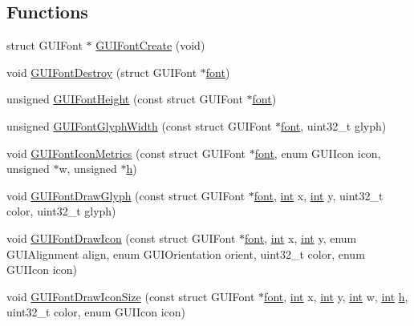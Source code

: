 \subsection*{Functions}
\begin{DoxyCompactItemize}
\item 
struct G\+U\+I\+Font $\ast$ \mbox{\hyperlink{wii_2gui-font_8c_afeda865aa70118eb5e13639aeea185e5}{G\+U\+I\+Font\+Create}} (void)
\item 
void \mbox{\hyperlink{wii_2gui-font_8c_aa30d3bddfd055be2a203306973eb2b6a}{G\+U\+I\+Font\+Destroy}} (struct G\+U\+I\+Font $\ast$\mbox{\hyperlink{wii_2main_8c_adae3f41cbe0ea5e886715661bb739691}{font}})
\item 
unsigned \mbox{\hyperlink{wii_2gui-font_8c_a6d539c7b23450b8918bb6499e2c11042}{G\+U\+I\+Font\+Height}} (const struct G\+U\+I\+Font $\ast$\mbox{\hyperlink{wii_2main_8c_adae3f41cbe0ea5e886715661bb739691}{font}})
\item 
unsigned \mbox{\hyperlink{wii_2gui-font_8c_a4b38c72440f93dd3f4c6d01848a23203}{G\+U\+I\+Font\+Glyph\+Width}} (const struct G\+U\+I\+Font $\ast$\mbox{\hyperlink{wii_2main_8c_adae3f41cbe0ea5e886715661bb739691}{font}}, uint32\+\_\+t glyph)
\item 
void \mbox{\hyperlink{wii_2gui-font_8c_a70534a7637eda192a15884d8930a61b8}{G\+U\+I\+Font\+Icon\+Metrics}} (const struct G\+U\+I\+Font $\ast$\mbox{\hyperlink{wii_2main_8c_adae3f41cbe0ea5e886715661bb739691}{font}}, enum G\+U\+I\+Icon icon, unsigned $\ast$w, unsigned $\ast$\mbox{\hyperlink{isa-lr35902_8c_a06a62682361411df32cf88f75a0b8da4}{h}})
\item 
void \mbox{\hyperlink{wii_2gui-font_8c_a7be283f1f320dc6308f9bc4ac24c4da7}{G\+U\+I\+Font\+Draw\+Glyph}} (const struct G\+U\+I\+Font $\ast$\mbox{\hyperlink{wii_2main_8c_adae3f41cbe0ea5e886715661bb739691}{font}}, \mbox{\hyperlink{ioapi_8h_a787fa3cf048117ba7123753c1e74fcd6}{int}} x, \mbox{\hyperlink{ioapi_8h_a787fa3cf048117ba7123753c1e74fcd6}{int}} y, uint32\+\_\+t color, uint32\+\_\+t glyph)
\item 
void \mbox{\hyperlink{wii_2gui-font_8c_a89adf10a0ec4d3b2dfba92b95ab17ad5}{G\+U\+I\+Font\+Draw\+Icon}} (const struct G\+U\+I\+Font $\ast$\mbox{\hyperlink{wii_2main_8c_adae3f41cbe0ea5e886715661bb739691}{font}}, \mbox{\hyperlink{ioapi_8h_a787fa3cf048117ba7123753c1e74fcd6}{int}} x, \mbox{\hyperlink{ioapi_8h_a787fa3cf048117ba7123753c1e74fcd6}{int}} y, enum G\+U\+I\+Alignment align, enum G\+U\+I\+Orientation orient, uint32\+\_\+t color, enum G\+U\+I\+Icon icon)
\item 
void \mbox{\hyperlink{wii_2gui-font_8c_ae9ac7ef646aad8e77b04baf500472178}{G\+U\+I\+Font\+Draw\+Icon\+Size}} (const struct G\+U\+I\+Font $\ast$\mbox{\hyperlink{wii_2main_8c_adae3f41cbe0ea5e886715661bb739691}{font}}, \mbox{\hyperlink{ioapi_8h_a787fa3cf048117ba7123753c1e74fcd6}{int}} x, \mbox{\hyperlink{ioapi_8h_a787fa3cf048117ba7123753c1e74fcd6}{int}} y, \mbox{\hyperlink{ioapi_8h_a787fa3cf048117ba7123753c1e74fcd6}{int}} w, \mbox{\hyperlink{ioapi_8h_a787fa3cf048117ba7123753c1e74fcd6}{int}} \mbox{\hyperlink{isa-lr35902_8c_a06a62682361411df32cf88f75a0b8da4}{h}}, uint32\+\_\+t color, enum G\+U\+I\+Icon icon)
\end{DoxyCompactItemize}


